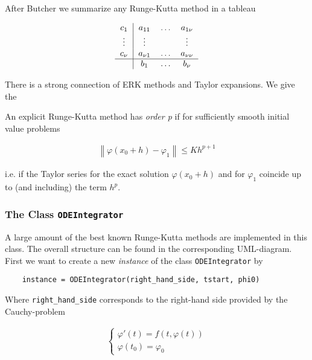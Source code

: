 After Butcher we summarize any Runge-Kutta method in a tableau

\begin{gather}
	\begin{tabular}{c|ccc}
			$c_1$ & $a_{11}$ & $\hdots$ & $a_{1\nu}$\\
			$\vdots$ & $\vdots$ & & $\vdots$\\
			$c_\nu$ & $a_{\nu 1}$ & $\hdots$ & $a_{\nu \nu}$\\
			\hline
			& $b_1$ & $\hdots$ & $b_\nu$
	\end{tabular}
\end{gather}

There is a strong connection of ERK methods and Taylor expansions. We give the 

\begin{mdframed}
	\begin{definition}
		An explicit Runge-Kutta method has \emph{order p} if for sufficiently smooth initial value problems

		\begin{gather}
			\left\| \varphi(x_0 + h) - \varphi_1\right\| \leqslant K h^{p+1}
		\end{gather} 

		i.e. if the Taylor series for the exact solution $\varphi(x_0 + h)$ and for $\varphi_1$ coincide up to (and including) the term $h^p$.
	\end{definition}
\end{mdframed}

\subsubsection{The Class \texttt{ODEIntegrator}}
A large amount of the best known Runge-Kutta methods are implemented in this class. The overall structure can be found in the corresponding UML-diagram. First we want to create a new \emph{instance} of the class \texttt{ODEIntegrator} by

\begin{verbatim}
	instance = ODEIntegrator(right_hand_side, tstart, phi0)
\end{verbatim}

Where \texttt{right\_hand\_side} corresponds to the right-hand side provided by the Cauchy-problem

\begin{gather}
	\begin{cases}
		\varphi'(t) = f(t, \varphi(t))\\
		\varphi(t_0) = \varphi_0
	\end{cases}
\end{gather}

